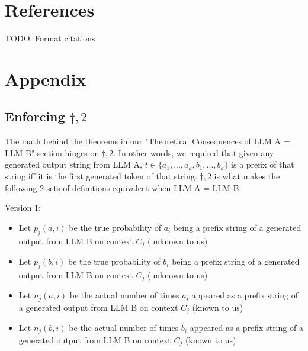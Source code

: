 \documentclass{article}
\begin{document}
\section{References}

TODO: Format citations

\section{Appendix}
\subsection{Enforcing $\dagger,2$}

The math behind the theorems in our "Theoretical Consequences of LLM A = LLM B" section hinges on $\displaystyle \dagger ,2$. In other words, we required that given any generated output string from LLM A, $\displaystyle t\in \{a_{1} ,...,a_{k} ,b_{1} ,...,b_{k}\}$ is a prefix of that string iff it is the first generated token of that string. $\displaystyle \dagger ,2$ is what makes the following 2 sets of definitions equivalent when LLM A = LLM B:



Version 1:
\begin{itemize}
\item Let $\displaystyle p_{j}( a,i)$ be the true probability of $\displaystyle a_{i}$ being a prefix string of a generated output from LLM B on context $\displaystyle C_{j}$ (unknown to us)
\item Let $\displaystyle p_{j}( b,i)$ be the true probability of $\displaystyle b_{i}$ being a prefix string of a generated output from LLM B on context $\displaystyle C_{j}$ (unknown to us)
\item Let $\displaystyle n_{j}( a,i)$ be the actual number of times $\displaystyle a_{i}$ appeared as a prefix string of a generated output from LLM B on context $\displaystyle C_{j}$ (known to us)
\item Let $\displaystyle n_{j}( b,i)$ be the actual number of times $\displaystyle b_{i}$ appeared as a prefix string of a generated output from LLM B on context $\displaystyle C_{j}$ (known to us)
\end{itemize}
\end{document}
